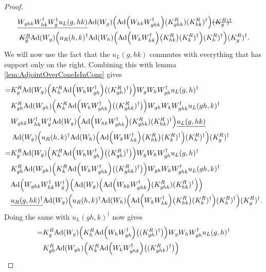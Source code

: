 \documentclass[11pt,a4paper,twoside]{article}
\numberwithin{equation}{section}
\begin{document}
{\begin{proof}
\begin{align}
			\nonumber
			&\underline{W_{ghk}W_{hk}^\dagger W_{g}^\dagger u_L(g,hk)} \Ad{W_g}\left( \Ad{W_{hk}W_{ghk}^\dagger}(K^R_{ghk})(K^R_{hk})^{\dagger} \right)\stkout{(K^R_g)^\dagger}\\
			\nonumber
			&\:\stkout{K^R_g}\Ad{W_g}\left(u_R(h,k)^\dagger \Ad{W_h}\left(\Ad{W_kW_{hk}^\dagger}\left(K_{hk}^R\right)(K^R_k)^\dagger\right)(K^R_h)^\dagger\right)(K^R_g)^\dagger.
		\end{align}
		We will now use the fact that the $u_L(g,hk)$ commutes with everything that has support only on the right. Combining this with lemma \ref{lem:AdjointOverConeIsInCone} gives
		\begin{align}
			=&K_g^R\Ad{W_g}\left(K_h^R\Ad{W_hW_{gh}^\dagger}\left((K_{gh}^R)^\dagger\right)\right)W_gW_hW_{gh}^\dagger u_L(g,h)^\dagger\\
			\nonumber
			&K_{gh}^R\Ad{W_{gh}}\left(K_k^R\Ad{W_kW_{ghk}^\dagger}\left((K_{ghk}^R)^\dagger\right)\right) W_{gh}W_kW_{ghk}^\dagger u_L(gh,k)^\dagger\\
			\nonumber
			&W_{ghk}W_{hk}^\dagger W_{g}^\dagger \Ad{W_g}\left( \Ad{W_{hk}W_{ghk}^\dagger}(K^R_{ghk})(K^R_{hk})^{\dagger} \right)\underline{u_L(g,hk)}\\
			\nonumber
			&\:\Ad{W_g}\left(u_R(h,k)^\dagger \Ad{W_h}\left(\Ad{W_kW_{hk}^\dagger}\left(K_{hk}^R\right)(K^R_k)^\dagger\right)(K^R_h)^\dagger\right)(K^R_g)^\dagger\\
			=&K_g^R\Ad{W_g}\left(K_h^R\Ad{W_hW_{gh}^\dagger}\left((K_{gh}^R)^\dagger\right)\right)W_gW_hW_{gh}^\dagger u_L(g,h)^\dagger\\
			\nonumber
			&K_{gh}^R\Ad{W_{gh}}\left(K_k^R\Ad{W_kW_{ghk}^\dagger}\left((K_{ghk}^R)^\dagger\right)\right) W_{gh}W_kW_{ghk}^\dagger u_L(gh,k)^\dagger\\
			\nonumber
			&\Ad{W_{ghk}W_{hk}^\dagger W_{g}^\dagger}  \left(\Ad{W_g}\left( \Ad{W_{hk}W_{ghk}^\dagger}(K^R_{ghk})(K^R_{hk})^{\dagger} \right)\right)\\
			\nonumber
			&\underline{u_R(g,hk)^\dagger}\Ad{W_g}\left(u_R(h,k)^\dagger \Ad{W_h}\left(\Ad{W_kW_{hk}^\dagger}\left(K_{hk}^R\right)(K^R_k)^\dagger\right)(K^R_h)^\dagger\right)(K^R_g)^\dagger.
		\end{align}
		Doing the same with $u_L(gh,k)^\dagger$ now gives
		\begin{align}
			=&K_g^R\Ad{W_g}\left(K_h^R\Ad{W_hW_{gh}^\dagger}\left((K_{gh}^R)^\dagger\right)\right)W_gW_hW_{gh}^\dagger u_L(g,h)^\dagger\\
			\nonumber
			&K_{gh}^R\Ad{W_{gh}}\left(K_k^R\Ad{W_kW_{ghk}^\dagger}\left((K_{ghk}^R)^\dagger\right)\right)  \\

\end{align}
\end{proof}}
\end{document}
